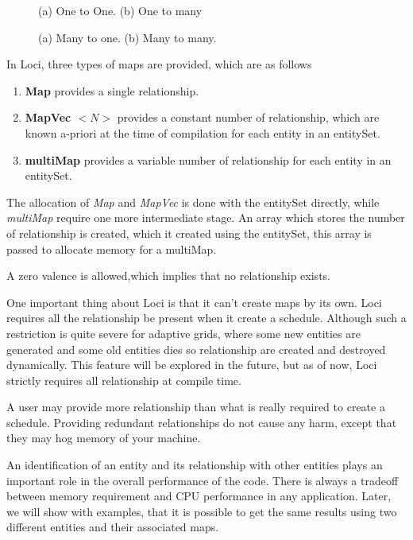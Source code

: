 \begin{figure}[h]
\vspace{2.0in}\caption {(a) One to One. (b) One to many}
\label{FigMap1}
\end{figure}

\begin{figure}[h]
\vspace{2.1in}\caption { (a) Many to one. (b) Many to many.}
\label{FigMap2}
\end{figure}

\par In Loci, three types of maps are provided, which are as follows

\begin{enumerate}
\item {\bf Map}  provides a single relationship.
\item {\bf MapVec $<N>$} provides a constant number of relationship, which are 
known a-priori at the time of compilation for each entity in an entitySet.
\item {\bf multiMap} provides a variable number of relationship for each 
entity in an entitySet.
\end{enumerate}

\par The allocation of {\em Map} and {\em MapVec} is done with the entitySet
directly, while {\em multiMap} require one more intermediate stage. An
array which stores the number of relationship is created, which it 
created using the entitySet, this array is passed to allocate memory
for a multiMap.  
\par A zero valence is allowed,which implies that no relationship exists.
%
\par One important thing about Loci is that it can't create maps by its own.
Loci requires all the relationship be present when it create a schedule. Although
such a restriction is quite severe for adaptive grids, where some new entities
are generated and some old entities dies so relationship are created and
destroyed dynamically. This feature will be explored in the future,
but as of now, Loci strictly requires all relationship at compile time.
%
\par A user may provide more relationship than what is really required to 
create a schedule. Providing redundant relationships do not cause any harm,
except that they may hog memory of your machine. 
%
\par An identification of an entity and its relationship with other entities
plays an important role in the overall performance of the code. There is always
a tradeoff between memory requirement and CPU performance in any application.
Later, we will show with examples, that it is possible to get the same results using
two different entities and their associated maps.

